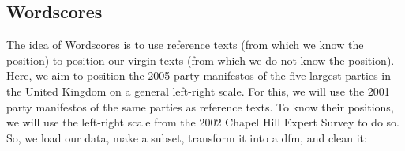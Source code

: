 \documentclass[
]{article}
\begin{document}
\hypertarget{wordscores}{%
\subsection{Wordscores}\label{wordscores}}

The idea of Wordscores is to use reference texts (from which we know the position) to position our virgin texts (from which we do not know the position). Here, we aim to position the 2005 party manifestos of the five largest parties in the United Kingdom on a general left-right scale. For this, we will use the 2001 party manifestos of the same parties as reference texts. To know their positions, we will use the left-right scale from the 2002 Chapel Hill Expert Survey \autocite{Bakker2012a} to do so. So, we load our data, make a subset, transform it into a dfm, and clean it:
\end{document}
